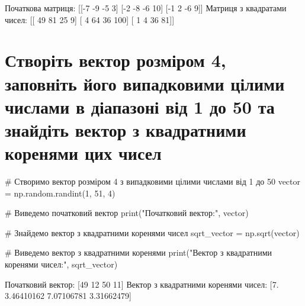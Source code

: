 \documentclass[]{article}
\newcounter{pythoncode}
\begin{document}
\begin{out}
	Початкова матриця:
	[[-7 -9 -5  3]
	 [-2 -8 -6 10]
	 [-1  2 -6  9]]
	Матриця з квадратами чисел:
	[[ 49  81  25   9]
	 [  4  64  36 100]
	 [  1   4  36  81]]
\end{out}

\section{Створіть вектор розміром 4, заповніть його випадковими цілими числами в діапазоні від 1 до 50 та знайдіть вектор з квадратними коренями цих чисел}

\begin{pythoncode}
    # Створимо вектор розміром 4 з випадковими цілими числами від 1 до 50
    vector = np.random.randint(1, 51, 4)

    # Виведемо початковий вектор
    print("Початковий вектор:", vector)

    # Знайдемо вектор з квадратними коренями чисел
    sqrt_vector = np.sqrt(vector)

    # Виведемо вектор з квадратними коренями
    print("Вектор з квадратними коренями чисел:", sqrt_vector)
\end{pythoncode}

\begin{out}
	Початковий вектор: [49 12 50 11]
	Вектор з квадратними коренями чисел: [7. 3.46410162 7.07106781 3.31662479]
\end{out}
\end{document}
